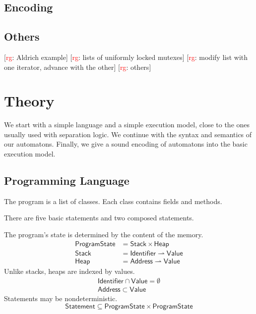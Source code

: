 \documentclass[a4paper]{article}
\newcommand{\todo}[2]{{\small [\textcolor{red}{#1}: #2]}}
\newcommand{\rg}[1]{\todo{rg}{#1}}
\newcommand{\pmap}{\rightharpoonup}
\theoremstyle{remark}
\begin{document}
\subsection{Encoding} %



\subsection{Others} %

\rg{Aldrich example}
\rg{lists of uniformly locked mutexes}
\rg{modify list with one iterator, advance with the other}
\rg{others}

\section{Theory} %

We start with a simple language and a simple execution model, close to the ones usually used with separation logic.
We continue with the syntax and semantics of our automatons.
Finally, we give a sound encoding of automatons into the basic execution model.

\subsection{Programming Language} %

The program is a list of classes.
Each class contains fields and methods.


\noindent There are five basic statements and two composed statements.



The program's state is determined by the content of the memory.
\begin{align}
\mathsf{ProgramState}&=\mathsf{Stack}\times\mathsf{Heap} \\
\mathsf{Stack}&=\mathsf{Identifier}\pmap\mathsf{Value} \\
\mathsf{Heap}&=\mathsf{Address}\pmap\mathsf{Value}
\end{align}
Unlike stacks, heaps are indexed by values.
\begin{gather}
\mathsf{Identifier}\cap\mathsf{Value}=\emptyset \\
\mathsf{Address}\subset\mathsf{Value}
\end{gather}
Statements may be nondeterministic.
\begin{equation}
\mathsf{Statement}\subseteq\mathsf{ProgramState}\times\mathsf{ProgramState}
\end{equation}
\end{document}
